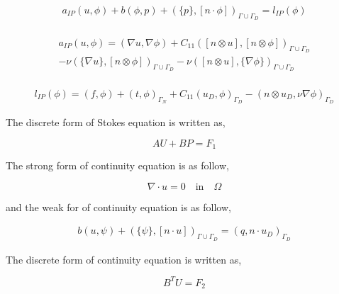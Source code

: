 \documentclass[a4paper,12pt]{book}
\begin{document}
\begin{equation}\label{stokes_weak}
\begin{split}
a_{IP}(u,\phi) + b(\phi,p) + (\{p\},[n\cdot \phi])_{\Gamma \cup \Gamma_D} = l_{IP}(\phi) 
\end{split}
\end{equation}
\\
\begin{equation}
\begin{split}
a_{IP}(u,\phi) = (\nabla u, \nabla \phi) + C_{11} ([n \otimes u],[n \otimes \phi])_{\Gamma \cup \Gamma_D} \\
- \nu (\{\nabla u\},[n \otimes \phi])_{\Gamma \cup \Gamma_D} - \nu ([n \otimes u],\{\nabla \phi\})_{\Gamma \cup \Gamma_D}
\end{split}
\end{equation}
\\
\begin{equation}
\begin{split}
l_{IP}(\phi) = (f,\phi) + (t,\phi)_{\Gamma_N} + C_{11} (u_D,\phi)_{\Gamma_D} - (n \otimes u_D, \nu \nabla \phi)_{\Gamma_D}
\end{split}
\end{equation}

The discrete form of Stokes equation is written as,

\begin{equation} \label{stokes discrete}
AU + BP = F_1
\end{equation}

The strong form of continuity equation is as follow,

\begin{equation}
\nabla \cdot u = 0 \quad \textrm{in} \quad \Omega
\end{equation}

and the weak for of continuity equation is as follow,

\begin{equation}\label{contiuity_weak}
\begin{split}
b(u,\psi) + (\{\psi\},[n\cdot u])_{\Gamma \cup \Gamma_D} = (q,n\cdot u_D)_{\Gamma_D} 
\end{split}
\end{equation}

The discrete form of continuity equation is written as,

\begin{equation} \label{continuity discrete}
B^T U  = F_2
\end{equation}
\end{document}
